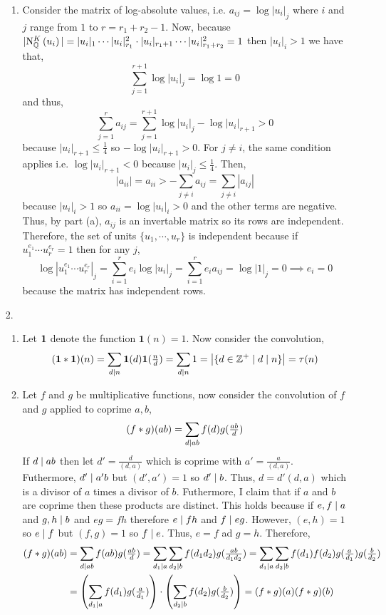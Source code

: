 \documentclass[12pt]{extarticle}
\begin{document}
\begin{enumerate}
\begin{enumerate}
\item Consider the matrix of log-absolute values, i.e. $a_{ij} = \log{|u_i|_j}$ where $i$ and $j$ range from $1$ to $r = r_1 + r_2 - 1$. Now, because $|\mathrm{N}^{K}_{\mathbb{Q}}\left(u_i\right)| = |u_i|_1 \cdots |u_i|_{r_1}^2 \cdot |u_i|_{r_1 + 1} \cdots |u_i|_{r_1 + r_2}^2 = 1$ then $|u_i|_i > 1$ we have that,
\[ \sum_{j = 1}^{r + 1} \log{|u_i|_j} = \log{1} = 0 \] 
and thus,
\[ \sum_{j = 1}^{r} a_{ij} = \sum_{j = 1}^{r + 1} \log{|u_i|_j} - \log{|u_i|_{r+1}} > 0  \]
because $|u_i|_{r+1} \le \frac{1}{4}$ so $-\log{|u_i|_{r+1}} > 0$. For $j \neq i$, the same condition applies i.e. $\log{|u_i|_{r+1}} < 0$ because $|u_i|_{j} \le \frac{1}{4}$. Then,
\[|a_{ii}| = a_{ii} > - \sum_{j \neq i} a_{ij} = \sum_{j \neq i} |a_{ij}| \]  
because $|u_i|_i > 1$ so $a_{ii} = \log{|u_i|_i} > 0$ and the other terms are negative. Thus, by part (a), $a_{ij}$ is an invertable matrix so its rows are independent. Therefore, the set of units $\{u_1, \cdots, u_r \}$ is independent because if $u_1^{e_1} \cdots u_{r}^{e_r} = 1$ then for any $j$, 
\[\log{|u_1^{e_1} \cdots u_{r}^{e_r}|_j} = \sum_{i = 1}^{r} e_i \log{|u_i|_j} = \sum_{i = 1}^{r} e_i a_{ij} = \log{|1|_j} = 0 \implies e_i = 0\]
because the matrix has independent rows.  

\end{enumerate}
\item[2.]
\begin{enumerate}
\item Let $\bf{1}$ denote the function $\mathbf{1}(n) = 1$. Now consider the convolution,\[ (\mathbf{1} * \mathbf{1})(n) = \sum_{d \mid n} \mathbf{1}(d) \mathbf{1}(\tfrac{n}{d}) = \sum_{d \mid n} 1 = \left|\{ d \in \mathbb{Z}^{+} \mid d \mid n \} \right| = \tau(n)\]
\item Let $f$ and $g$ be multiplicative functions, now consider the convolution of $f$ and $g$ applied to coprime $a,b$,
\[ (f * g)(ab) = \sum_{d \mid ab} f(d) g(\tfrac{ab}{d}) \]
If $d \mid ab$ then let $d' = \frac{d}{(d, a)}$ which is coprime with $a' = \frac{a}{(d, a)}$. Futhermore, $d' \mid a'b$ but $(d', a') = 1$ so $d' \mid b$. Thus, $d = d' (d, a)$ which is a divisor of $a$ times a divisor of $b$. Futhermore, I claim that if $a$ and $b$ are coprime then these products are distinct. This holds because if $e,f \mid a$ and $g,h \mid b$ and $eg = fh$ therefore $e \mid fh$ and $f \mid eg$. However, $(e,h) = 1$ so $e \mid f$ but $(f, g) = 1$ so $f \mid e$. Thus, $e = f$ ad $g = h$. Therefore,     
\begin{align*}
(f * g)(ab) & = \sum_{d \mid ab} f(ab) g(\tfrac{ab}{d}) = \sum_{d_1 \mid a} \sum_{d_2 \mid b} f(d_1 d_2) g(\tfrac{ab}{d_1 d_2}) = \sum_{d_1 \mid a} \sum_{d_2 \mid b} f(d_1) f(d_2) g(\tfrac{a}{d_1}) g(\tfrac{b}{d_2}) \\ & = \left( \sum_{d_1 \mid a}  f(d_1) g(\tfrac{a}{d_1}) \right) \cdot \left( \sum_{d_2 \mid b} f(d_2) g(\tfrac{b}{d_2}) \right) = (f * g)(a) (f * g)(b) 
\end{align*} 


\end{enumerate}
\end{enumerate}
\end{document}

